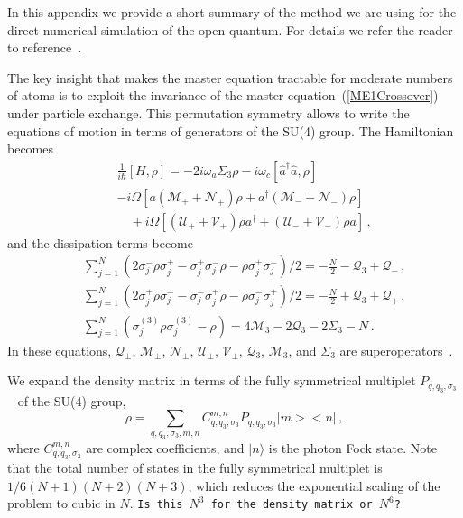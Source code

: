 \documentclass[aps,
twocolumn,
showpacs,
superscriptaddress,groupedaddress]{revtex4}
\newcommand{\dmcomment}[1]{{\tt #1}}
\begin{document}
In this appendix we provide a short summary of the method we are using
for the direct numerical simulation of the open quantum.  For details we
refer the reader to reference~\cite{PhysRevA.87.062101}.

The key insight that makes the master equation tractable for moderate
numbers of atoms is to exploit the invariance of the
master equation~(\ref{ME1Crossover}) under particle exchange.  This
permutation symmetry allows to write the equations of motion in terms of
generators of the SU(4) group.  The Hamiltonian becomes
\begin{eqnarray}
  &&\frac{1}{i\hbar}[H,\rho]=
  -2i \omega_a \Sigma_3\rho -i\omega_c [ \hat{a}^{\dagger}\hat{a}, \rho]
  \nonumber
  \\
  &&-i\Omega \left[a(\mathcal{M}_++\mathcal{N}_+)\rho+a^\dagger
    (\mathcal{M}_-+\mathcal{N}_-)\rho\right]\nonumber\\
  &&\quad{}+i\Omega\left[(\mathcal{U}_++\mathcal{V}_+)\rho a^\dagger
    +(\mathcal{U}_-+\mathcal{V}_-)\rho a\right]\,,
\end{eqnarray}
and the dissipation terms become
\begin{eqnarray}\label{liv}
 && \sum_{j=1}^N(
   2\sigma_j^-\rho\sigma_j^+-\sigma_j^+ \sigma_j^-\rho-
   \rho \sigma_j^+\sigma_j^-
  )/2=-\frac{N}{2}-
  \mathcal{Q}_3+\mathcal{Q}_{-}\,,\nonumber\\
 && \sum_{j=1}^N(
   2\sigma_j^+\rho\sigma_j^--\sigma_j^- \sigma_j^+\rho-
   \rho \sigma_j^-\sigma_j^+
  )/2=-\frac{N}{2}+
  \mathcal{Q}_3+\mathcal{Q}_{+}\,,\nonumber\\
 && \sum_{j=1}^N(\sigma_j^{(3)}\rho\sigma_j^{(3)}-\rho)=4\mathcal{M}_3-2
  \mathcal{Q}_3-2\Sigma_3-N\,.
  \label{ham}
\end{eqnarray}
In these equations, $\mathcal{Q}_{\pm}$, $\mathcal{M}_{\pm}$, $\mathcal{N}_{\pm}$,
$\mathcal{U}_{\pm}$, $\mathcal{V}_{\pm}$, $\mathcal{Q}_3$, $\mathcal{M}_3$,
and $\Sigma_3$ are superoperators~\cite{PhysRevA.87.062101}.

We expand the density matrix in terms of the fully symmetrical multiplet
$P_{q,q_3,\sigma_3}$~\cite{PhysRevA.87.062101} of the SU(4) group,
\begin{equation}\label{ex}
  \rho=\sum_{q,q_3,\sigma_3,m,n} C_{q,q_3,\sigma_3}^{m,n}
  P_{q,q_3,\sigma_3}\bigl|m\bigr>\bigl<n\bigr|\,,
\end{equation}
where $C_{q,q_3,\sigma_3}^{m,n}$ are complex coefficients, and
$|n\rangle$ is the photon Fock state. Note that the total number of
states in the fully symmetrical multiplet is $1/6 (N+1)(N+2)(N+3)$,
which reduces the exponential scaling of the problem to cubic in $N$.
\dmcomment{Is this $N^3$ for the density matrix or $N^6$?}
\end{document}
